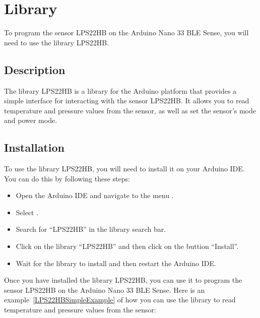 \section{Library}

To program the sensor LPS22HB on the Arduino Nano 33 BLE Sense, you will need to use the library LPS22HB. \cite{ArduinoLPS22HB:2024}

\subsection{Description}

The library LPS22HB is a library for the Arduino platform that provides a simple interface for interacting with the sensor LPS22HB. It allows you to read temperature and pressure values from the sensor, as well as set the sensor's mode and power mode. \cite{ArduinoLPS22HB:2024}


\subsection{Installation}

To use the library LPS22HB, you will need to install it on your Arduino IDE. You can do this by following these steps:

\begin{itemize}
    \item Open the Arduino IDE and navigate to the menu .
    \item Select .
    \item Search for ``LPS22HB'' in the library search bar.
    \item Click on the library ``LPS22HB''  and then click on the buttion ``Install''.
    \item Wait for the library to install and then restart the Arduino IDE.
\end{itemize}

\medskip

Once you have installed the library LPS22HB, you can use it to program the sensor LPS22HB on the Arduino Nano 33 BLE Sense. Here is an example~\ref{LPS22HBSimpleExample} of how you can use the library to read temperature and pressure values from the sensor:

\medskip

{
    \label{LPS22HBSimpleExample.ino}
}

